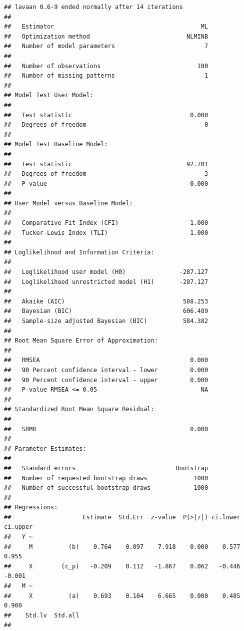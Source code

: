 \documentclass[
]{book}
\begin{document}
\begin{verbatim}
## lavaan 0.6-9 ended normally after 14 iterations
## 
##   Estimator                                         ML
##   Optimization method                           NLMINB
##   Number of model parameters                         7
##                                                       
##   Number of observations                           100
##   Number of missing patterns                         1
##                                                       
## Model Test User Model:
##                                                       
##   Test statistic                                 0.000
##   Degrees of freedom                                 0
## 
## Model Test Baseline Model:
## 
##   Test statistic                                92.701
##   Degrees of freedom                                 3
##   P-value                                        0.000
## 
## User Model versus Baseline Model:
## 
##   Comparative Fit Index (CFI)                    1.000
##   Tucker-Lewis Index (TLI)                       1.000
## 
## Loglikelihood and Information Criteria:
## 
##   Loglikelihood user model (H0)               -287.127
##   Loglikelihood unrestricted model (H1)       -287.127
##                                                       
##   Akaike (AIC)                                 588.253
##   Bayesian (BIC)                               606.489
##   Sample-size adjusted Bayesian (BIC)          584.382
## 
## Root Mean Square Error of Approximation:
## 
##   RMSEA                                          0.000
##   90 Percent confidence interval - lower         0.000
##   90 Percent confidence interval - upper         0.000
##   P-value RMSEA <= 0.05                             NA
## 
## Standardized Root Mean Square Residual:
## 
##   SRMR                                           0.000
## 
## Parameter Estimates:
## 
##   Standard errors                            Bootstrap
##   Number of requested bootstrap draws             1000
##   Number of successful bootstrap draws            1000
## 
## Regressions:
##                    Estimate  Std.Err  z-value  P(>|z|) ci.lower ci.upper
##   Y ~                                                                   
##     M          (b)    0.764    0.097    7.918    0.000    0.577    0.955
##     X        (c_p)   -0.209    0.112   -1.867    0.062   -0.446   -0.001
##   M ~                                                                   
##     X          (a)    0.693    0.104    6.665    0.000    0.485    0.900
##    Std.lv  Std.all
##                   

\end{verbatim}
\end{document}
